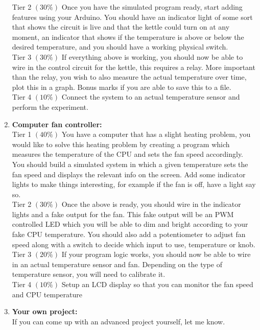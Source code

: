 \begin{enumerate}
	  Tier 2 $\left(30\%\right)$ Once you have the simulated program ready, start adding features using your Arduino. You should have an indicator light of some sort that shows the circuit is live and that the kettle could turn on at any moment, an indicator that shows if the temperature is above or below the desired temperature, and you should have a working physical switch.\\
	  
	  Tier 3 $\left(30\%\right)$ If everything above is working, you should now be able to wire in the control circuit for the kettle, this requires a relay. More important than the relay, you wish to also measure the actual temperature over time, plot this in a graph. Bonus marks if you are able to save this to a file.\\
	  
	  Tier 4 $\left(10\%\right)$ Connect the system to an actual temperature sensor and perform the experiment.\\
	  
	  \item \textbf{Computer fan controller:}\\
	  
	  Tier 1 $\left(40\%\right)$ You have a computer that has a slight heating problem, you would like to solve this heating problem by creating a program which measures the temperature of the CPU and sets the fan speed accordingly. You should build a simulated system in which a given temperature sets the fan speed and displays the relevant info on the screen. Add some indicator lights to make things interesting, for example if the fan is off, have a light say so.\\
	  
	  Tier 2 $\left(30\%\right)$ Once the above is ready, you should wire in the indicator lights and a fake output for the fan. This fake output will be an PWM controlled LED which you will be able to dim and bright according to your fake CPU temperature. You should also add a potentiometer to adjust fan speed along with a switch to decide which input to use, temperature or knob.\\
	  
	  Tier 3 $\left(20\%\right)$ If your program logic works, you should now be able to wire in an actual temperature sensor and fan. Depending on the type of temperature sensor, you will need to calibrate it.\\
	  
	  Tier 4 $\left(10\%\right)$ Setup an LCD display so that you can monitor the fan speed and CPU temperature\\
	  
	  \item \textbf{Your own project:}\\
	  
	  If you can come up with an advanced project yourself, let me know.
	  
\end{enumerate}